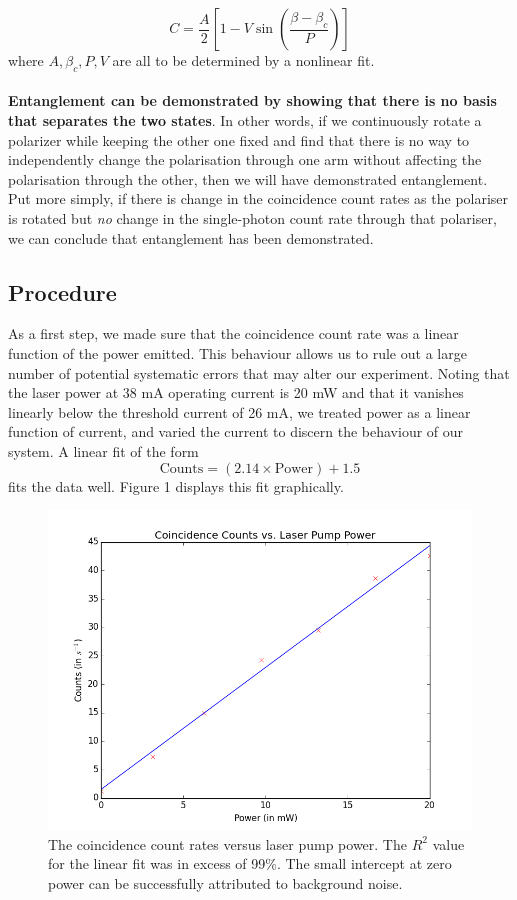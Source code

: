 \documentclass[10pt,a4paper]{article}
\begin{document}
\begin{equation}
C = \dfrac{A}{2}\left[1 - V\sin\left(\dfrac{\beta - \beta_{c}}{P}\right)\right]
\end{equation} 
where $A,\beta_{c}, P, V$ are all to be determined by a nonlinear fit.\\
\\
\textbf{Entanglement can be demonstrated by showing that there is no basis that separates the two states}. In other words, if we continuously rotate a polarizer while keeping the other one fixed and find that there is no way to independently change the polarisation through one arm without affecting the polarisation through the other, then we will have demonstrated entanglement. Put more simply, if there  is change in the coincidence count rates as the polariser is rotated but \textit{no} change in the single-photon count rate through that polariser, we can conclude that entanglement has been demonstrated.

\subsection*{Procedure}

As a first step, we made sure that the coincidence count rate was a linear function of the power emitted. This behaviour allows us to rule out a large number of potential systematic errors that may alter our experiment. Noting that the laser power at 38 mA operating current is 20 mW and that it vanishes linearly below the threshold current of 26 mA, we treated power as a linear function of current, and varied the current to discern the behaviour of our system. A linear fit of the form 
$$\mathrm{Counts} = \left(2.14\times\mathrm{Power}\right) + 1.5$$
fits the data well. Figure 1 displays this fit graphically.

\begin{figure}[H]
\centering
\includegraphics[scale=0.6]{../Analysis/countvspower.png}
\caption{The coincidence count rates versus laser pump power. The $R^{2}$ value for the linear fit was in excess of 99\%. The small intercept at zero power can be successfully attributed to background noise.} 
\end{figure}
\end{document}
